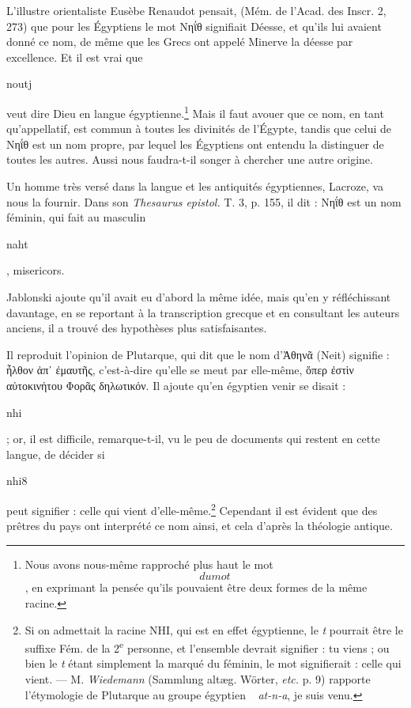 \documentclass[a4paper, 11pt, oneside]{article}
\newcommand*\hieroAAAH{}
\newcommand*\hieroAAAQ{}
\newcommand*\hieroAAKE{}
\newcommand*\hieroABEX{}
\newcommand*\hieroABFF{}
\begin{document}
L'illustre orientaliste Eusèbe Renaudot pensait, (Mém. de l'Acad. des Inscr. 2, 273) que pour les Égyptiens le mot Νηΐθ signifiait Déesse, et qu'ils lui avaient donné ce nom, de même que les Grecs ont appelé Minerve la déesse par excellence. Et il est vrai que \begin{coptic}noutj\end{coptic} veut dire Dieu en langue égyptienne.\footnote{Nous avons nous-même rapproché plus haut le mot $\hieroAAAQ$ du mot $\hieroABEX$, en exprimant la pensée qu'ils pouvaient être deux formes de la même racine.} Mais il faut avouer que ce nom, en tant qu'appellatif, est commun à toutes les divinités de l'Égypte, tandis que celui de Νηΐθ est un nom propre, par lequel les Égyptiens ont entendu la distinguer de toutes les autres. Aussi nous faudra-t-il songer à chercher une autre origine.

Un homme très versé dans la langue et les antiquités égyptiennes, Lacroze, va nous la fournir. Dans son \emph{Thesaurus epistol.} T. 3, p. 155, il dit : Νηΐθ est un nom féminin, qui fait au masculin \begin{coptic}naht\end{coptic}, misericors.

Jablonski ajoute qu'il avait eu d'abord la même idée, mais qu'en y réfléchissant davantage, en se reportant à la transcription grecque et en consultant les auteurs anciens, il a trouvé des hypothèses plus satisfaisantes.

Il reproduit l'opinion de Plutarque, qui dit que le nom d'Ἀθηνᾶ (Neit) signifie : ἦλθον ἀπ᾿ ἐμαυτῆς, c'est-à-dire qu'elle se meut par elle-même, ὅπερ ἐστὶν αὐτοκινήτου Φορᾶς δηλωτικόν. Il ajoute qu'en égyptien venir se disait : \begin{coptic}nhi\end{coptic} ; or, il est difficile, remarque-t-il, vu le peu de documents qui restent en cette langue, de décider si \begin{coptic}nhi8\end{coptic} peut signifier : celle qui vient d'elle-même.\footnote{Si on admettait la racine NHI, qui est en effet égyptienne, le \emph{t} pourrait être le suffixe Fém. de la 2\textsuperscript{e} personne, et l'ensemble devrait signifier : tu viens ; ou bien le \emph{t} étant simplement la marqué du féminin, le mot signifierait : celle qui vient. --- M. \emph{Wiedemann} (Sammlung altæg. Wörter, \emph{etc.} p. 9) rapporte l'étymologie de Plutarque au groupe égyptien $\hieroAAAH\:\hieroABFF\:\hieroAAKE$ \emph{at-n-a}, je suis venu.} Cependant il est évident que des prêtres du pays ont interprété ce nom ainsi, et cela d'après la théologie antique.
\end{document}
